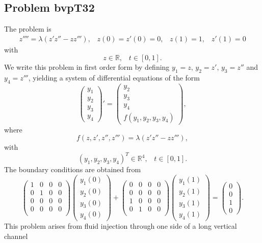 \documentclass[<options>]{article}
\def \RR {{\mathbb{R}}}
\begin{document}
\subsection{Problem bvpT32}\label{test32}
The problem is 
\begin{eqnarray*}
z'''' =\lambda( z' z'' -  z z''') , \;\;\;z(0) =z'(0) = 0, \;\;\; z(1) = 1,\;\;\; z'(1) = 0
\end{eqnarray*}
with
\[
z \in \RR, \;\;\; t\in [0,1].
\]
We write this problem in first order form by defining $y_1=z,\,y_2 = z',\,y_3 = z''$ and $y_4 = z'''$, yielding a system of differential equations of the form
\begin{equation*}
\left(\begin{array}{c}
y_1\\
y_2\\
y_3\\
y_4
\end{array}\right)'=
\left(\begin{array}{c}
y_2\\
y_3\\
y_4\\
f(y_1,y_2,y_3,y_4)
\end{array}\right),
\end{equation*}
where
\begin{equation*}
f(z,z',z'',z''') = \lambda( z' z'' -  z z'''),
\end{equation*}
with
\[
(y_1,y_2,y_3,y_4)^T \in \RR^{4}, \;\;\;  t \in [0,1].
\]
The  boundary conditions are obtained from
\begin{equation*}
\left(
  \begin{array}{cccc}
    1 & 0 & 0 & 0\\
    0 & 1 & 0 & 0\\
    0 & 0 & 0 & 0\\
    0 & 0 & 0 & 0\\
  \end{array}
\right)
\left(\begin{array}{c}
y_{1}(0)\\
y_{2}(0)\\
y_{3}(0)\\
y_{4}(0)
\end{array}\right)
+
\left(
  \begin{array}{cccc}
    0 & 0 & 0 & 0\\
    0 & 0 & 0 & 0\\
    1 & 0 & 0 & 0\\
    0 & 1 & 0 & 0\\
  \end{array}
\right)
\left(\begin{array}{c}
y_{1}(1)\\
y_{2}(1)\\
y_{3}(1)\\
y_{4}(1)
\end{array}\right)=\left(\begin{array}{c}
0 \\
0 \\
1\\
0
\end{array}\right).
\end{equation*}
This problem arises from fluid injection through one side of a long vertical
channel
\end{document}
